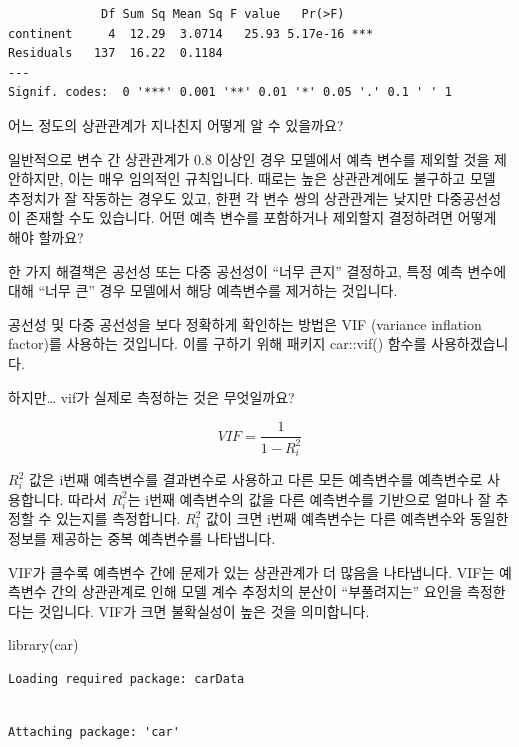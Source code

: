 \documentclass[
  letterpaper,
  DIV=11,
  numbers=noendperiod]{scrartcl}
\newenvironment{Shaded}{\begin{snugshade}}{\end{snugshade}}
\newcommand{\FunctionTok}[1]{\textcolor[rgb]{0.28,0.35,0.67}{#1}}
\newcommand{\NormalTok}[1]{\textcolor[rgb]{0.00,0.23,0.31}{#1}}
\begin{document}
\begin{verbatim}
             Df Sum Sq Mean Sq F value   Pr(>F)    
continent     4  12.29  3.0714   25.93 5.17e-16 ***
Residuals   137  16.22  0.1184                     
---
Signif. codes:  0 '***' 0.001 '**' 0.01 '*' 0.05 '.' 0.1 ' ' 1
\end{verbatim}

어느 정도의 상관관계가 지나친지 어떻게 알 수 있을까요?

일반적으로 변수 간 상관관계가 0.8 이상인 경우 모델에서 예측 변수를
제외할 것을 제안하지만, 이는 매우 임의적인 규칙입니다. 때로는 높은
상관관계에도 불구하고 모델 추정치가 잘 작동하는 경우도 있고, 한편 각
변수 쌍의 상관관계는 낮지만 다중공선성이 존재할 수도 있습니다. 어떤 예측
변수를 포함하거나 제외할지 결정하려면 어떻게 해야 할까요?

한 가지 해결책은 공선성 또는 다중 공선성이 ``너무 큰지'' 결정하고, 특정
예측 변수에 대해 ``너무 큰'' 경우 모델에서 해당 예측변수를 제거하는
것입니다.

공선성 및 다중 공선성을 보다 정확하게 확인하는 방법은 VIF (variance
inflation factor)를 사용하는 것입니다. 이를 구하기 위해 패키지
car::vif() 함수를 사용하겠습니다.

하지만\ldots{} vif가 실제로 측정하는 것은 무엇일까요?

\[VIF=\frac{1}{1-R_i^2}\]

\(R_i^2\) 값은 i번째 예측변수를 결과변수로 사용하고 다른 모든 예측변수를
예측변수로 사용합니다. 따라서 \(R_i^2\)는 i번째 예측변수의 값을 다른
예측변수를 기반으로 얼마나 잘 추정할 수 있는지를 측정합니다. \(R_i^2\)
값이 크면 i번째 예측변수는 다른 예측변수와 동일한 정보를 제공하는 중복
예측변수를 나타냅니다.

VIF가 클수록 예측변수 간에 문제가 있는 상관관계가 더 많음을 나타냅니다.
VIF는 예측변수 간의 상관관계로 인해 모델 계수 추정치의 분산이
``부풀려지는'' 요인을 측정한다는 것입니다. VIF가 크면 불확실성이 높은
것을 의미합니다.

\begin{Shaded}
\begin{Highlighting}[]
\FunctionTok{library}\NormalTok{(car)}
\end{Highlighting}
\end{Shaded}

\begin{verbatim}
Loading required package: carData
\end{verbatim}

\begin{verbatim}

Attaching package: 'car'
\end{verbatim}
\end{document}
